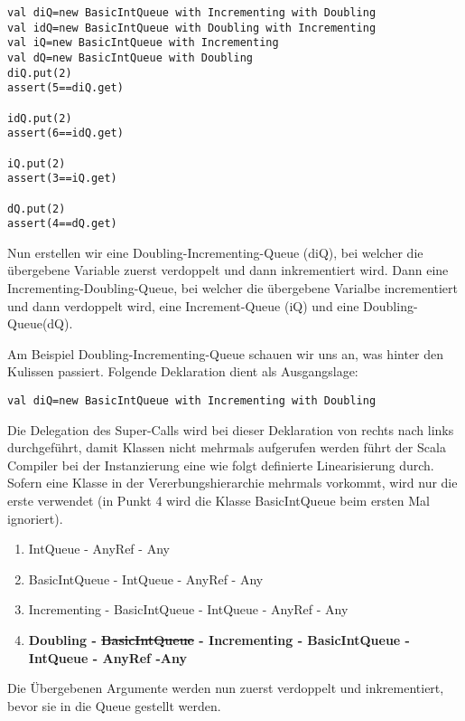 \begin{lstlisting}[caption=Traits: Verschiedene Instanzen vom Typ IntQueue und die entsprechenden Auswirkungen]
val diQ=new BasicIntQueue with Incrementing with Doubling
val idQ=new BasicIntQueue with Doubling with Incrementing
val iQ=new BasicIntQueue with Incrementing
val dQ=new BasicIntQueue with Doubling
diQ.put(2)
assert(5==diQ.get)

idQ.put(2)
assert(6==idQ.get)

iQ.put(2)
assert(3==iQ.get)

dQ.put(2)
assert(4==dQ.get)
\end{lstlisting}
Nun erstellen wir eine Doubling-Incrementing-Queue (diQ), bei welcher die \"ubergebene Variable zuerst verdoppelt und dann inkrementiert wird. Dann eine Incrementing-Doubling-Queue, bei welcher die \"ubergebene Varialbe incrementiert und dann verdoppelt wird, eine Increment-Queue (iQ) und eine Doubling-Queue(dQ).

Am Beispiel Doubling-Incrementing-Queue schauen wir uns an, was hinter den Kulissen passiert. Folgende Deklaration dient als Ausgangslage: 
\begin{lstlisting}[caption=Traits: Deklaration Doubling-Incrementing-Queue]
val diQ=new BasicIntQueue with Incrementing with Doubling
\end{lstlisting}

Die Delegation des Super-Calls wird bei dieser Deklaration von rechts nach links durchgeführt, damit Klassen nicht mehrmals aufgerufen werden führt der Scala Compiler bei der Instanzierung eine wie folgt definierte Linearisierung durch. Sofern eine Klasse in der Vererbungshierarchie mehrmals vorkommt, wird nur die erste verwendet (in Punkt 4 wird die Klasse BasicIntQueue beim ersten Mal ignoriert). 
\begin{enumerate}
	\item IntQueue - AnyRef - Any
	\item BasicIntQueue - IntQueue - AnyRef - Any
	\item Incrementing - BasicIntQueue - IntQueue - AnyRef - Any
	\item \bf{Doubling - \sout{BasicIntQueue} - Incrementing - BasicIntQueue - IntQueue - AnyRef -Any}
\end{enumerate}
Die \"Ubergebenen Argumente werden nun zuerst verdoppelt und inkrementiert, bevor sie in die Queue gestellt werden.



